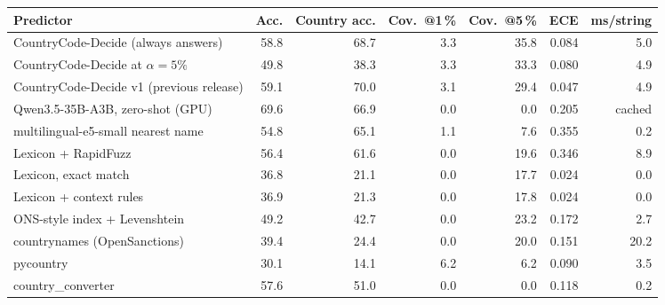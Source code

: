 \begin{tabular}{lrrrrrr}
\toprule
Predictor & Acc. & Country acc. & Cov.\ @1\,\% & Cov.\ @5\,\% & ECE & ms/string \\
\midrule
CountryCode-Decide (always answers) & 58.8 & 68.7 & 3.3 & 35.8 & 0.084 & 5.0 \\
CountryCode-Decide at $\alpha = 5\%$ & 49.8 & 38.3 & 3.3 & 33.3 & 0.080 & 4.9 \\
CountryCode-Decide v1 (previous release) & 59.1 & 70.0 & 3.1 & 29.4 & 0.047 & 4.9 \\
\midrule
Qwen3.5-35B-A3B, zero-shot (GPU) & 69.6 & 66.9 & 0.0 & 0.0 & 0.205 & cached \\
multilingual-e5-small nearest name & 54.8 & 65.1 & 1.1 & 7.6 & 0.355 & 0.2 \\
Lexicon + RapidFuzz & 56.4 & 61.6 & 0.0 & 19.6 & 0.346 & 8.9 \\
Lexicon, exact match & 36.8 & 21.1 & 0.0 & 17.7 & 0.024 & 0.0 \\
Lexicon + context rules & 36.9 & 21.3 & 0.0 & 17.8 & 0.024 & 0.0 \\
ONS-style index + Levenshtein & 49.2 & 42.7 & 0.0 & 23.2 & 0.172 & 2.7 \\
countrynames (OpenSanctions) & 39.4 & 24.4 & 0.0 & 20.0 & 0.151 & 20.2 \\
pycountry & 30.1 & 14.1 & 6.2 & 6.2 & 0.090 & 3.5 \\
country\_converter & 57.6 & 51.0 & 0.0 & 0.0 & 0.118 & 0.2 \\
\bottomrule
\end{tabular}
